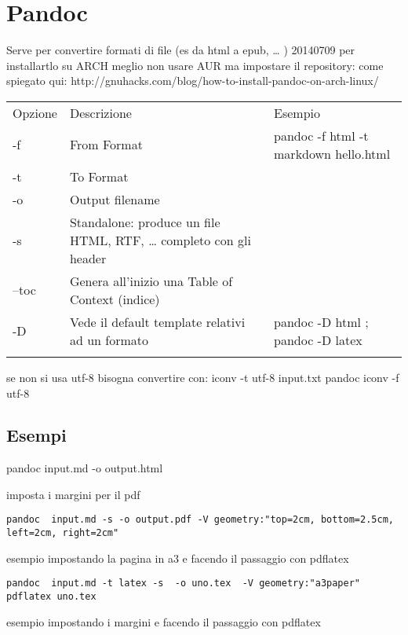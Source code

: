 \documentclass[]{article}
\begin{document}
\section{Pandoc}\label{pandoc}

Serve per convertire formati di file (es da html a epub, \ldots{} )
20140709 per installartlo su ARCH meglio non usare AUR ma impostare il
repository: come spiegato qui:
http://gnuhacks.com/blog/how-to-install-pandoc-on-arch-linux/

\begin{longtable}[l]{@{}lll@{}}
\toprule\addlinespace
Opzione & Descrizione & Esempio
\\\addlinespace
\midrule\endhead
-f & From Format & pandoc -f html -t markdown hello.html
\\\addlinespace
-t & To Format
\\\addlinespace
-o & Output filename
\\\addlinespace
-s & Standalone: produce un file HTML, RTF, \ldots{} completo con gli
header
\\\addlinespace
--toc & Genera all'inizio una Table of Context (indice)
\\\addlinespace
-D & Vede il default template relativi ad un formato & pandoc -D html ;
pandoc -D latex
\\\addlinespace
\bottomrule
\end{longtable}

se non si usa utf-8 bisogna convertire con: iconv -t utf-8 input.txt
\textbar{} pandoc \textbar{} iconv -f utf-8

\subsection{Esempi}\label{esempi}

pandoc input.md -o output.html

imposta i margini per il pdf

\begin{verbatim}
pandoc  input.md -s -o output.pdf -V geometry:"top=2cm, bottom=2.5cm, left=2cm, right=2cm"
\end{verbatim}

esempio impostando la pagina in a3 e facendo il passaggio con pdflatex

\begin{verbatim}
pandoc  input.md -t latex -s  -o uno.tex  -V geometry:"a3paper"
pdflatex uno.tex
\end{verbatim}

esempio impostando i margini e facendo il passaggio con pdflatex
\end{document}
